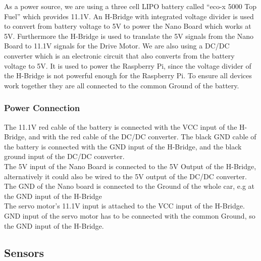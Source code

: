 \documentclass[11pt,twocolumn]{article}
\begin{document}
As a power source, we are using a three cell LIPO battery called “eco-x 5000 Top Fuel” which provides 11.1V. An H-Bridge with integrated voltage divider is used to convert from battery voltage to 5V to power the Nano Board which works at 5V. Furthermore the H-Bridge is used to translate the 5V signals from the Nano Board to 11.1V signals for the Drive Motor. We are also using a DC/DC converter which is an electronic circuit that also converts from the battery voltage to 5V. It is used to power the Raspberry Pi, since the voltage divider of the H-Bridge is not powerful enough for the Raspberry Pi. To ensure all devices work together they are all connected to the common Ground of the battery.


\subsubsection{Power Connection}

The 11.1V red cable of the battery is connected with the VCC input of the H-Bridge, and with the red cable of the DC/DC converter. The black GND cable of the battery is connected with the GND input of the H-Bridge, and the black ground input of the DC/DC converter.\\
The 5V input of the Nano Board is connected to the 5V Output of the H-Bridge, alternatively it could also be wired to the 5V output of the DC/DC converter. The GND of the Nano board is connected to the Ground of the whole car, e.g at the GND input of the H-Bridge\\
The servo motor's 11.1V input is attached to the VCC input of the H-Bridge. GND input of the servo motor has to be connected with the common Ground, so the GND input of the H-Bridge.


\subsection{Sensors}
\end{document}
